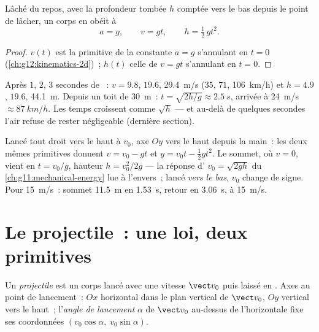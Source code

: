 \begin{proposition}\label{prop:g12:projectile-motion:vertical}
Lâché du repos, avec la profondeur tombée $h$ comptée vers le bas
depuis le point de lâcher, un corps en 
obéit à
\[
a = g, \qquad v = g t, \qquad h = \tfrac12\, g t^2 .
\]
\end{proposition}

\begin{proof}
$v(t)$ est la primitive de la constante $a = g$ s'annulant en $t = 0$
(\cref{ch:g12:kinematics-2d})~; $h(t)$ celle de $v = gt$ s'annulant en
$t = 0$.
\end{proof}

\begin{example}\label{ex:g12:projectile-motion:orders}
Après $1$, $2$, $3$ secondes de ~:
$v = 9.8$, $19.6$, \qty{29.4}{m/s} ($35$, $71$, \qty{106}{km/h}) et
$h = 4.9$, $19.6$, \qty{44.1}{m}. Depuis un toit de \qty{30}{m}~:
$t = \sqrt{2h/g} \approx \qty{2.5}{s}$, arrivée à
\qty{24}{m/s} $\approx \qty{87}{km/h}$. Les temps croissent comme
$\sqrt h$ --- et au-delà de quelques secondes l'air refuse de rester
négligeable (dernière section).
\end{example}

\begin{example}\label{ex:g12:projectile-motion:throw}
Lancé tout droit vers le haut à $v_0$, axe $Oy$ vers le haut depuis
la main~: les deux mêmes primitives donnent $v = v_0 - gt$ et
$y = v_0 t - \tfrac12 gt^2$. Le sommet, où $v = 0$, vient en
$t = v_0/g$, hauteur $h = v_0^2/2g$ --- la réponse
d' $v_0 = \sqrt{2gh}$ du
\cref{ch:g11:mechanical-energy} lue à l'envers~; lancé \emph{vers le
bas}, $v_0$ change de signe. Pour \qty{15}{m/s}~: sommet \qty{11.5}{m}
en \qty{1.53}{s}, retour en \qty{3.06}{s}, à \qty{15}{m/s}.
\end{example}

\section{Le projectile~: une loi, deux primitives}

\begin{definition}[Projectile]\label{def:g12:projectile-motion:projectile}
Un \emph{projectile} est un corps lancé avec une
vitesse $\vect v_0$ puis laissé en . Axes
au point de lancement~: $Ox$ horizontal dans le plan vertical de
$\vect v_0$, $Oy$ vertical vers le haut~; l'\emph{angle de
lancement} $\alpha$ de $\vect v_0$ au-dessus
de l'horizontale fixe ses coordonnées
$(v_0\cos\alpha,\; v_0\sin\alpha)$.
\end{definition}


